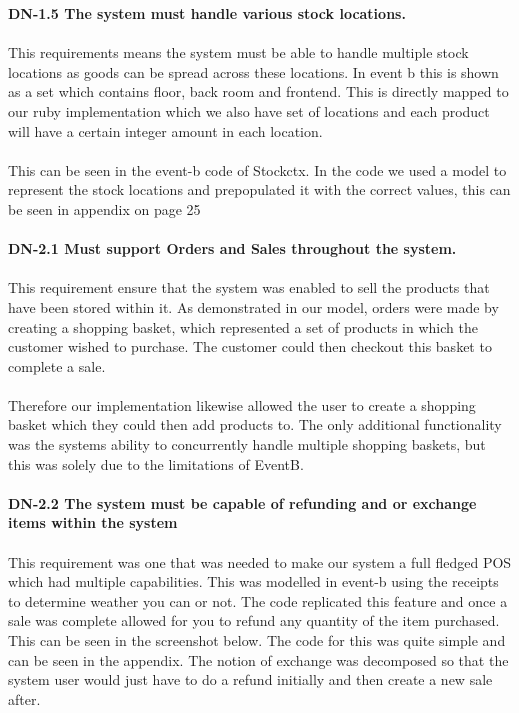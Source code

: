 \documentclass[a4paper]{article}
\begin{document}
\textbf{DN-1.5 The system must handle various stock locations.}
\\\\
This requirements means the system must be able to handle multiple stock locations as goods can be spread across these locations. In event b this is shown as a set which contains floor, back room and frontend. This is directly mapped to our ruby implementation which we also have set of locations and each product will have a certain integer amount in each location. 
\\\\
This can be seen in the event-b code of Stockctx. In the code we used a model to represent the stock locations and prepopulated it with the correct values, this can be seen in appendix on page 25
\\\\
\textbf{DN-2.1 Must support Orders and Sales throughout the system.}
\\\\
This requirement ensure that the system was enabled to sell the products that have been stored within it. As demonstrated in our model, orders were made by creating a shopping basket, which represented a set of products in which the customer wished to purchase. The customer could then checkout this basket to complete a sale.
\\\\
Therefore our implementation likewise allowed the user to create a shopping basket which they could then add products to. The only additional functionality was the systems ability to concurrently handle multiple shopping baskets, but this was solely due to the limitations of EventB.
\\\\
\textbf{DN-2.2 The system must be capable of refunding and or exchange items within the system}
\\\\
This requirement was one that was needed to make our system a full fledged POS which had multiple capabilities. This was modelled in event-b using the receipts to determine weather you can or not. The code replicated this feature and once a sale was complete allowed for you to refund any quantity of the item purchased. This can be seen in the screenshot below. The code for this was quite simple and can be seen in the appendix. The notion of exchange was decomposed so that the system user would just have to do a refund initially and then create a new sale after. 
\\\\
\end{document}
